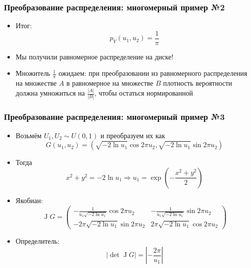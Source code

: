 \documentclass[handout,10pt]{beamer}
\begin{document}
\begin{frame}[fragile]
\frametitle{Преобразование распределения: многомерный пример №2}
\begin{itemize}
\item Итог: \begin{equation*}p_Y(u_1, u_2) = \frac{1}{\pi}\end{equation*}
\pause
\item Мы получили равномерное распределение на диске!
\pause
\item Множитель \begin{math}\frac{1}{\pi}\end{math} ожидаем: при преобразовании из равномерного распределения на множестве \begin{math}A\end{math} в равномерное на множестве \begin{math}B\end{math} плотность вероятности должна умножиться на \begin{math}\frac{|A|}{|B|}\end{math}, чтобы остаться нормированной
\end{itemize}
\end{frame}

\begin{frame}[fragile]
\frametitle{Преобразование распределения: многомерный пример №3}
\begin{itemize}
\item Возьмём \begin{math}U_1, U_2 \sim U(0,1)\end{math} и преобразуем их как
\begin{equation*}
G(u_1, u_2) = (\sqrt{-2\ln u_1}\cos 2\pi u_2, \sqrt{-2\ln u_1}\sin 2\pi u_2)
\end{equation*}
\pause
\item Тогда
\begin{equation*}
x^2+y^2 = -2\ln u_1 \Longrightarrow u_1 = \exp\left(-\frac{x^2+y^2}{2}\right)
\end{equation*}
\pause
\item Якобиан:
\begin{equation*}
\operatorname J G = \begin{pmatrix}
-\frac{1}{u_1 \sqrt{-2\ln u_1}}\cos 2\pi u_2 & -\frac{1}{u_1 \sqrt{-2\ln u_1}}\sin 2\pi u_2 \\
-2\pi\sqrt{-2\ln u_1} \sin 2\pi u_2 & 2\pi\sqrt{-2\ln u_1} \cos 2\pi u_2
\end{pmatrix}
\end{equation*}
\pause
\item Определитель:
\begin{equation*}
|\det \operatorname J G| = \left|-\frac{2 \pi}{u_1}\right|
\end{equation*}
\end{itemize}
\end{frame}
\end{document}
